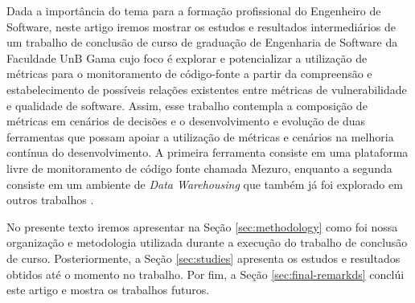 Dada a importância do tema para a formação profissional do Engenheiro de Software, neste artigo iremos mostrar os estudos e resultados intermediários de um trabalho de conclusão de curso de graduação de Engenharia de Software da Faculdade UnB Gama cujo foco é explorar e potencializar a utilização de métricas para o monitoramento de código-fonte a partir da compreensão e estabelecimento de possíveis relações existentes entre métricas de vulnerabilidade e qualidade de software. Assim, esse trabalho contempla a composição de métricas em cenários de decisões e o desenvolvimento e evolução de duas ferramentas que possam apoiar a utilização de métricas e cenários na melhoria contínua do desenvolvimento. A primeira ferramenta consiste em uma plataforma livre de monitoramento de código fonte chamada Mezuro, enquanto a segunda consiste em um ambiente de \emph{Data Warehousing} que também já foi explorado em outros trabalhos \cite{Folleco2007}\cite{Silveira2010}.

No presente texto iremos apresentar na Seção \ref{sec:methodology} como foi nossa organização e metodologia utilizada durante a execução do trabalho de conclusão de curso. Posteriormente, a Seção \ref{sec:studies} apresenta os estudos e resultados obtidos até o momento no trabalho. Por fim, a Seção \ref{sec:final-remarkds} conclúi este artigo e mostra os trabalhos futuros.
